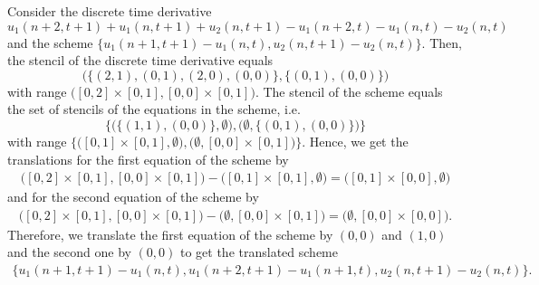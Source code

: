 \documentclass[runningheads]{llncs}
\newcommand{\1}{\chi}
\begin{document}
\begin{example}
	Consider the discrete time derivative
	\footnotesize
	\begin{equation*}
		u_1(n+2,t+1)+u_1(n,t+1)+u_2(n,t+1)-u_1(n+2,t)-u_1(n,t)-u_2(n,t)
	\end{equation*}
	\normalsize
	and the scheme
	\footnotesize
	$
	\{u_1(n+1,t+1)-u_1(n,t),u_2(n,t+1)-u_2(n,t)\}.
	$
	\normalsize
	Then, the stencil of the discrete time derivative equals
	\footnotesize
	\begin{equation*}
		\Big( \big\{ (2,1),(0,1),(2,0),(0,0) \big\},\big\{(0,1),(0,0)\big\} \Big)
	\end{equation*}
	\normalsize
	with range
	\footnotesize
	$
	\Big([0,2]\times[0,1],[0,0]\times [0,1]\Big).
	$
	\normalsize
	The stencil of the scheme equals the set of stencils of the equations in the scheme, i.e.
	\footnotesize
	\begin{equation*}
		\Big\{\Big(\big\{(1,1),(0,0)\big\},\emptyset\Big),\Big(\emptyset,\big\{(0,1),(0,0)\big\}\Big)\Big\}
	\end{equation*}
	\normalsize
	with range
	\footnotesize
	$
	\Big\{\Big([0,1]\times[0,1],\emptyset\Big),\Big(\emptyset,[0,0]\times [0,1]\Big)\Big\}.
	$
	\normalsize
	Hence, we get the translations for the first equation of the scheme by
	\footnotesize
	\begin{gather*}
		\Big([0,2]\times[0,1],[0,0]\times [0,1]\Big)-\Big([0,1]\times[0,1],\emptyset\Big)=\Big([0,1]\times[0,0],\emptyset\Big)
	\end{gather*}
	\normalsize
	and for the second equation of the scheme by
	\footnotesize
	\begin{gather*}
		\Big([0,2]\times[0,1],[0,0]\times [0,1]\Big)-\Big(\emptyset,[0,0]\times [0,1]\Big)=\Big(\emptyset,[0,0]\times [0,0]\Big).
	\end{gather*}
	\normalsize
	Therefore, we translate the first equation of the scheme by $(0,0)$ and $(1,0)$ and the second one by $(0,0)$ to get the translated scheme
	\footnotesize
	\begin{gather*}
		\{u_1(n+1,t+1)-u_1(n,t),
		u_1(n+2,t+1)-u_1(n+1,t),
		u_2(n,t+1)-u_2(n,t)
		\}.
	\end{gather*}
	\normalsize
\end{example}
\end{document}
